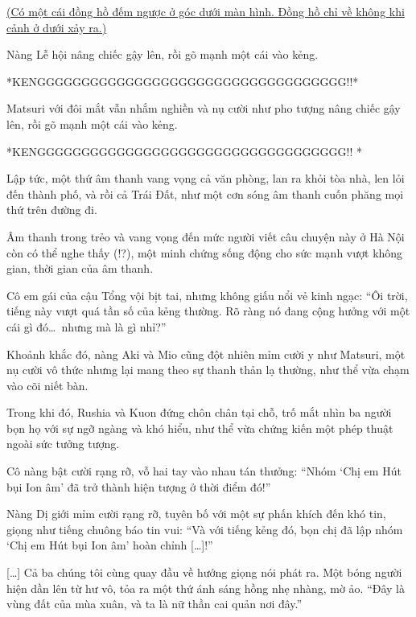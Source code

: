 \documentclass[../main.tex]{subfiles}
\begin{document}
\begin{center}
  \uline{(Có một cái đồng hồ đếm ngược ở góc dưới màn hình. Đồng hồ chỉ về không khi cảnh ở dưới xảy ra.)}
\end{center}

Nàng Lễ hội nâng chiếc gậy lên, rồi gõ mạnh một cái vào kẻng.

*KENGGGGGGGGGGGGGGGGGGGGGGGGGGGGGGGGGGG!!*


Matsuri với đôi mắt vẫn nhắm nghiền và nụ cười như pho tượng nâng chiếc gậy lên, rồi gõ mạnh một cái vào kẻng.

*KENGGGGGGGGGGGGGGGGGGGGGGGGGGGGGGGGGGG!! *


Lập tức, một thứ âm thanh vang vọng cả văn phòng, lan ra khỏi tòa nhà, len lỏi đến thành phố, và rồi cả Trái Đất, như một cơn sóng âm thanh cuốn phăng mọi thứ trên đường đi.

Âm thanh trong trẻo và vang vọng đến mức người viết câu chuyện này ở Hà Nội còn có thể nghe thấy (!?), một minh chứng sống động cho sức mạnh vượt không gian, thời gian của âm thanh.

Cô em gái của cậu Tổng vội bịt tai, nhưng không giấu nổi vẻ kinh ngạc: ``Ôi trời, tiếng này vượt quá tần số của kẻng thường. Rõ ràng nó đang cộng hưởng với một cái gì đó\dots\ nhưng mà là gì nhỉ?''

\ct

Khoảnh khắc đó, nàng Aki và Mio cũng đột nhiên mỉm cười y như Matsuri, một nụ cười vô thức nhưng lại mang theo sự thanh thản lạ thường, như thể vừa chạm vào cõi niết bàn.

Trong khi đó, Rushia và Kuon đứng chôn chân tại chỗ, trố mắt nhìn ba người bọn họ với sự ngỡ ngàng và khó hiểu, như thể vừa chứng kiến một phép thuật ngoài sức tưởng tượng.

Cô nàng bật cười rạng rỡ, vỗ hai tay vào nhau tán thưởng: ``Nhóm `Chị em Hút bụi Ion âm' đã trở thành hiện tượng ở thời điểm đó!''

Nàng Dị giới mỉm cười rạng rỡ, tuyên bố với một sự phấn khích đến khó tin, giọng như tiếng chuông báo tin vui: ``Và với tiếng kẻng đó, bọn chị đã lập nhóm `Chị em Hút bụi Ion âm' hoàn chỉnh [\dots]!''

{\color{silver}}   %


[\dots] Cả ba chúng tôi cùng quay đầu về hướng giọng nói phát ra. Một bóng người hiện dần lên từ hư vô, tỏa ra một thứ ánh sáng hồng nhẹ nhàng, mờ ảo. ``Đây là vùng đất của mùa xuân, và ta là nữ thần cai quản nơi đây.''
\end{document}
